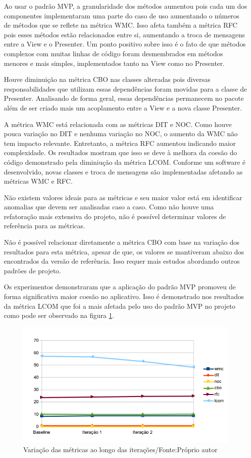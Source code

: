 Ao usar o padrão MVP, a granularidade dos métodos aumentou pois cada um dos
componentes implementaram uma parte do caso de uso aumentando o números de
métodos que se reflete na métrica WMC. Isso afeta também a métrica RFC pois
esses métodos estão relacionados entre si, aumentando a troca de mensagens entre
a View e o Presenter. Um ponto positivo sobre isso é o fato de que métodos 
complexos com muitas linhas de código foram desmembrados em métodos menores e
mais simples, implementados tanto na View como no Presenter.

Houve diminuição na métrica CBO nas classes alteradas pois diversas
responsabilidades que utilizam essas dependências foram movidas para a classe de
Presenter. Analisando de forma geral, essas dependências permanecem no pacote
além de ser criado mais um acoplamento entre a View e a nova classe Presenter.

A métrica WMC está relacionada com as métricas DIT e NOC. Como houve pouca
variação no DIT e nenhuma variação no NOC, o aumento da WMC não tem impacto
relevante. Entretanto, a métrica RFC aumentou indicando maior complexidade. Os
resultados mostram que isso se deve à melhora da coesão do código demonstrado pela
diminiução da métrica LCOM. Conforme um software é desenvolvido, novas classes e
troca de mensagens são implementadas afetando as métricas WMC e RFC. 

Não existem valores ideais para as métricas e seu maior valor está em
identificar anomalias que devem ser analisadas caso a caso. Como não houve uma refatoração
mais extensiva do projeto, não é possível determinar valores de referência para
as métricas. 

Não é possível relacionar diretamente a métrica CBO com base na
variação dos resultados para esta métrica, apesar de que, os valores se
mantiveram abaixo dos encontrados da versão de referência.
Isso requer mais estudos abordando outros padrões de projeto. 

Os experimentos demonstraram que a aplicação do padrão MVP promoveu de forma
significativa maior coesão no aplicativo. Isso é demonstrado nos resultados da
métrica LCOM que foi a mais afetada pelo uso do padrão MVP no projeto como pode
ser observado na figura \ref{fig:allmetrics}.

\begin{figure}[!h]
	\centering
	\includegraphics{img/allmetrics}
	\caption[Variação das métricas ao longo das iterações]{Variação das métricas ao
	longo das iterações/Fonte:Próprio autor}
	\label{fig:allmetrics}
\end{figure}

